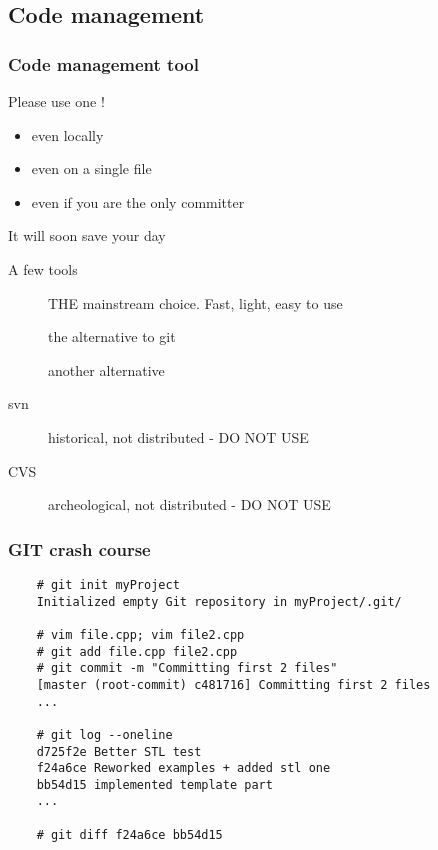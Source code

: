 \subsection[VCS]{Code management}

\begin{frame}[fragile]
  \frametitle{Code management tool}
  \begin{alertblock}{Please use one !}
    \begin{itemize}
    \item even locally
    \item even on a single file
    \item even if you are the only committer
    \end{itemize}
    It will soon save your day
  \end{alertblock}
  \begin{block}{A few tools}
    \begin{description}
    \item[\href{http://git-scm.com/}{}]
      THE mainstream choice. Fast, light, easy to use
    \item[\href{http://mercurial.selenic.com/}{}]
      the alternative to git
    \item[\href{http://bazaar.canonical.com/en/}{}]
      another alternative
    \item[svn]
      historical, not distributed - DO NOT USE
    \item[CVS]
      archeological, not distributed - DO NOT USE
    \end{description}
  \end{block}
\end{frame}

\begin{frame}[fragile]
  \frametitle{GIT crash course}
  \begin{verbatim}
    # git init myProject
    Initialized empty Git repository in myProject/.git/

    # vim file.cpp; vim file2.cpp
    # git add file.cpp file2.cpp
    # git commit -m "Committing first 2 files"
    [master (root-commit) c481716] Committing first 2 files
    ...

    # git log --oneline
    d725f2e Better STL test
    f24a6ce Reworked examples + added stl one
    bb54d15 implemented template part
    ...

    # git diff f24a6ce bb54d15
  \end{verbatim}
\end{frame}
